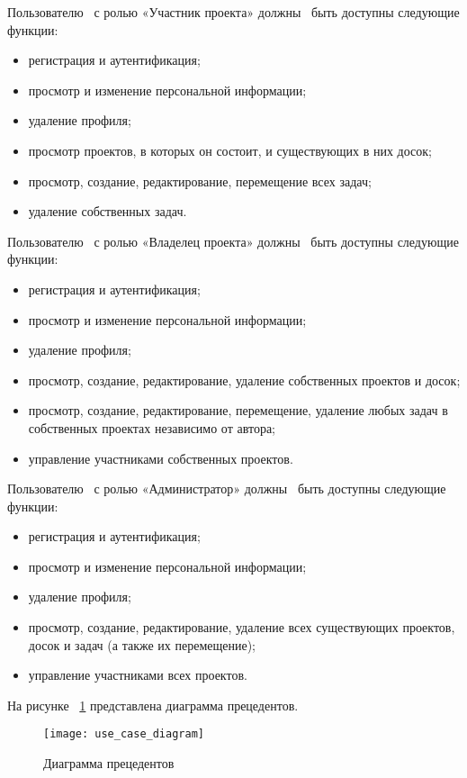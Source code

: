 Пользователю  с ролью «Участник проекта» должны  быть доступны следующие функции:
\begin{itemize}
	\item регистрация и аутентификация;
	\item просмотр и изменение персональной информации;
	\item удаление профиля;
	\item просмотр проектов, в которых он состоит, и существующих в них досок;
	\item просмотр, создание, редактирование, перемещение всех задач;
	\item удаление собственных задач.
\end{itemize}

Пользователю  с ролью «Владелец проекта» должны  быть доступны следующие функции:
\begin{itemize}
	\item регистрация и аутентификация;
	\item просмотр и изменение персональной информации;
	\item удаление профиля;
	\item просмотр, создание, редактирование, удаление собственных проектов и досок;
	\item просмотр, создание, редактирование, перемещение, удаление любых задач в собственных проектах независимо от автора;
	\item управление участниками собственных проектов.
\end{itemize}

Пользователю  с ролью «Администратор» должны  быть доступны следующие функции:
\begin{itemize}
	\item регистрация и аутентификация;
	\item просмотр и изменение персональной информации;
	\item удаление профиля;
	\item просмотр, создание, редактирование, удаление всех существующих проектов, досок и задач (а также их перемещение);
	\item управление участниками всех проектов.
\end{itemize}

На рисунке ~\ref{use_case_diagram:image} представлена диаграмма прецедентов.

\begin{figure}[H]
	\texttt{[image: use\_case\_diagram]}
	\caption{Диаграмма прецедентов}
	\label{use_case_diagram:image}
\end{figure}


